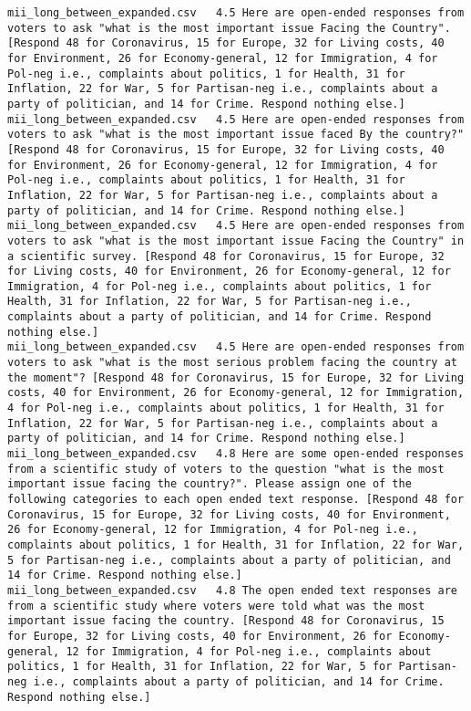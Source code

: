 \begin{lstlisting}[label=lst:promptvariants]
mii_long_between_expanded.csv	4.5	Here are open-ended responses from voters to ask "what is the most important issue Facing the Country". [Respond 48 for Coronavirus, 15 for Europe, 32 for Living costs, 40 for Environment, 26 for Economy-general, 12 for Immigration, 4 for Pol-neg i.e., complaints about politics, 1 for Health, 31 for Inflation, 22 for War, 5 for Partisan-neg i.e., complaints about a party of politician, and 14 for Crime. Respond nothing else.]
mii_long_between_expanded.csv	4.5	Here are open-ended responses from voters to ask "what is the most important issue faced By the country?" [Respond 48 for Coronavirus, 15 for Europe, 32 for Living costs, 40 for Environment, 26 for Economy-general, 12 for Immigration, 4 for Pol-neg i.e., complaints about politics, 1 for Health, 31 for Inflation, 22 for War, 5 for Partisan-neg i.e., complaints about a party of politician, and 14 for Crime. Respond nothing else.]
mii_long_between_expanded.csv	4.5	Here are open-ended responses from voters to ask "what is the most important issue Facing the Country" in a scientific survey. [Respond 48 for Coronavirus, 15 for Europe, 32 for Living costs, 40 for Environment, 26 for Economy-general, 12 for Immigration, 4 for Pol-neg i.e., complaints about politics, 1 for Health, 31 for Inflation, 22 for War, 5 for Partisan-neg i.e., complaints about a party of politician, and 14 for Crime. Respond nothing else.]
mii_long_between_expanded.csv	4.5	Here are open-ended responses from voters to ask "what is the most serious problem facing the country at the moment"? [Respond 48 for Coronavirus, 15 for Europe, 32 for Living costs, 40 for Environment, 26 for Economy-general, 12 for Immigration, 4 for Pol-neg i.e., complaints about politics, 1 for Health, 31 for Inflation, 22 for War, 5 for Partisan-neg i.e., complaints about a party of politician, and 14 for Crime. Respond nothing else.]
mii_long_between_expanded.csv	4.8	Here are some open-ended responses from a scientific study of voters to the question "what is the most important issue facing the country?". Please assign one of the following categories to each open ended text response. [Respond 48 for Coronavirus, 15 for Europe, 32 for Living costs, 40 for Environment, 26 for Economy-general, 12 for Immigration, 4 for Pol-neg i.e., complaints about politics, 1 for Health, 31 for Inflation, 22 for War, 5 for Partisan-neg i.e., complaints about a party of politician, and 14 for Crime. Respond nothing else.]
mii_long_between_expanded.csv	4.8	The open ended text responses are from a scientific study where voters were told what was the most important issue facing the country. [Respond 48 for Coronavirus, 15 for Europe, 32 for Living costs, 40 for Environment, 26 for Economy-general, 12 for Immigration, 4 for Pol-neg i.e., complaints about politics, 1 for Health, 31 for Inflation, 22 for War, 5 for Partisan-neg i.e., complaints about a party of politician, and 14 for Crime. Respond nothing else.]

\end{lstlisting}
